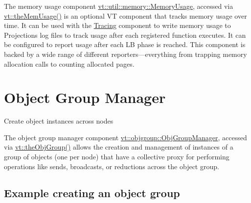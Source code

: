 The memory usage component {\ttfamily \hyperlink{structvt_1_1util_1_1memory_1_1_memory_usage}{vt\+::util\+::memory\+::\+Memory\+Usage}}, accessed via {\ttfamily \hyperlink{namespacevt_a38d485d3cf840b9a623e47e7754ef72e}{vt\+::the\+Mem\+Usage()}} is an optional VT component that tracks memory usage over time. It can be used with the \hyperlink{trace}{Tracing} component to write memory usage to Projections log files to track usage after each registered function executes. It can be configured to report usage after each LB phase is reached. This component is backed by a wide range of different reporters---everything from trapping memory allocation calls to counting allocated pages. \hypertarget{objgroup}{}\section{Object Group Manager}\label{objgroup}
Create object instances across nodes

The object group manager component {\ttfamily \hyperlink{structvt_1_1objgroup_1_1_obj_group_manager}{vt\+::objgroup\+::\+Obj\+Group\+Manager}}, accessed via {\ttfamily \hyperlink{namespacevt_a833f0115b692f578167cbd88e30d39c5}{vt\+::the\+Obj\+Group()}} allows the creation and management of instances of a group of objects (one per node) that have a collective proxy for performing operations like sends, broadcasts, or reductions across the object group.\hypertarget{objgroup_objgroup-example}{}\subsection{Example creating an object group}\label{objgroup_objgroup-example}

